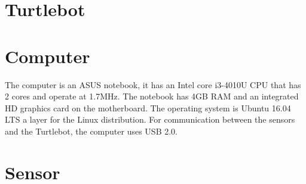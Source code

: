\label{ch:Implementationtheory}

\section{Turtlebot} %

\section{Computer} 
The computer is an ASUS notebook, it has an Intel core i3-4010U CPU that has 2 cores and operate at 1.7MHz\cite{CPU}. The notebook has 4GB RAM and an integrated HD graphics card on the motherboard\cite{ASUS}.
The operating system is Ubuntu 16.04 LTS a layer for the Linux distribution. For communication between the sensors and the Turtlebot, the computer uses USB 2.0.

\section{Sensor}
